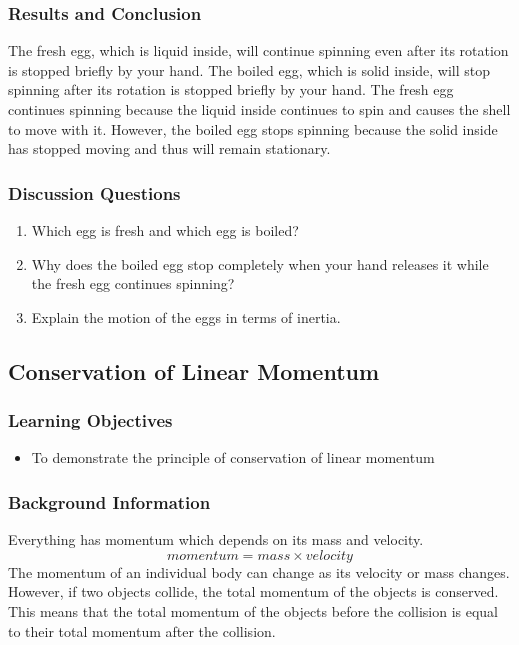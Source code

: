 \subsubsection*{Results and Conclusion}
The fresh egg, which is liquid inside, will continue spinning even after its rotation is stopped briefly by your hand. The boiled egg, which is solid inside, will stop spinning after its rotation is stopped briefly by your hand.  
The fresh egg continues spinning because the liquid inside continues to spin and causes the shell to move with it. However, the boiled egg stops spinning because the solid inside has stopped moving and thus will remain stationary.  

\subsubsection*{Discussion Questions}
\begin{enumerate}
\item{Which egg is fresh and which egg is boiled?}
\item{Why does the boiled egg stop completely when your hand releases it while the fresh egg continues spinning?}
\item{Explain the motion of the eggs in terms of inertia.} 
\end{enumerate}
 

\subsection{Conservation of Linear Momentum}

\subsubsection*{Learning Objectives}
\begin{itemize}
\item{To demonstrate the principle of conservation of linear momentum}
\end{itemize}

\subsubsection*{Background Information}
Everything has momentum which depends on its mass and velocity.  
$$momentum = mass \times velocity$$ 
The momentum of an individual body can change as its velocity or mass changes. However, if two objects collide, the total momentum of the objects is conserved.  This means that the total momentum of the objects before the collision is equal to their total momentum after the collision.

